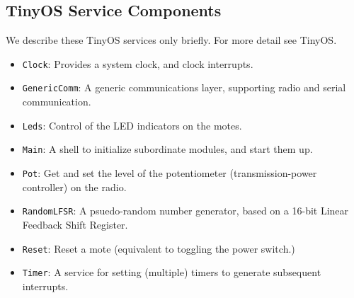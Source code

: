 \documentclass[11pt]{article}
\begin{document}
\subsection{TinyOS Service Components}
We describe these TinyOS services only briefly.  For
more detail see TinyOS.
\begin{itemize}
\item {\tt Clock}: Provides a system clock, and clock interrupts.
\item {\tt GenericComm}: A generic communications layer, supporting
  radio and serial communication.
\item {\tt Leds}: Control of the LED indicators on the motes.
\item {\tt Main}: A shell to initialize subordinate modules, and start
  them up.
\item {\tt Pot}: Get and set the level of the potentiometer
  (transmission-power controller) on the radio.
\item {\tt RandomLFSR}: A psuedo-random number generator, based on a
  16-bit Linear Feedback Shift Register.
\item {\tt Reset}:  Reset a mote (equivalent to toggling the 
power switch.)
\item {\tt Timer}: A service for setting (multiple) timers to generate
  subsequent interrupts.
\end{itemize}
\end{document}
